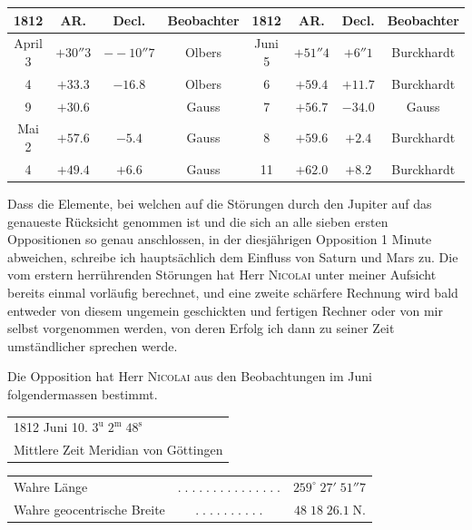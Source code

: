 \begin{center}\fontsize{9}{11}\selectfont\setlength{\tabcolsep}{3pt}
\renewcommand{\arraystretch}{1.15}\begin{tabular}{c|c|c|c||c|c|c|c}
1812 & AR. & Decl. & Beobachter & 1812 & AR. & Decl. & Beobachter\\\hline
April 3 & $+30''3$ & $-\!-10''7$ & Olbers & Juni 5 & $+51''4$ & $+6''1$ & Burckhardt\\
4 & $+33.3$ & $-16.8$ & Olbers & 6 & $+59.4$ & $+11.7$ & Burckhardt\\
9 & $+30.6$ &  & Gauss & 7 & $+56.7$ & $-34.0$ & Gauss\\
Mai 2 & $+57.6$ & $-5.4$ & Gauss & 8 & $+59.6$ & $+2.4$ & Burckhardt\\
4 & $+49.4$ & $+6.6$ & Gauss & 11 & $+62.0$ & $+8.2$ & Burckhardt\\
\end{tabular}\end{center}

\par\indent Dass die Elemente, bei welchen auf die Störungen durch den Jupiter auf das genaueste Rücksicht
genommen ist und die sich an alle sieben ersten Oppositionen so genau anschlossen, in der diesjährigen
Opposition 1 Minute abweichen, schreibe ich hauptsächlich dem Einfluss von Saturn und Mars
zu. Die vom erstern herrührenden Störungen hat Herr \textsc{Nicolai} unter meiner Aufsicht bereits einmal
vorläufig berechnet, und eine zweite schärfere Rechnung wird bald entweder von diesem ungemein geschickten
und fertigen Rechner oder von mir selbst vorgenommen werden, von deren Erfolg ich dann
zu seiner Zeit umständlicher sprechen werde.

\par\indent Die Opposition hat Herr \textsc{Nicolai} aus den Beobachtungen im Juni folgendermassen bestimmt.

\begin{center}\fontsize{10}{12}\selectfont\setlength{\tabcolsep}{0pt}\renewcommand{\arraystretch}{1.15}\begin{tabular}{l}
1812 Juni 10. $3^{\mathrm u}\;2^{\mathrm m}\;48^{\mathrm s}$\\Mittlere Zeit Meridian von Göttingen
\end{tabular}\end{center}
\begin{center}\fontsize{10}{12}\selectfont\setlength{\tabcolsep}{2pt}\renewcommand{\arraystretch}{1.15}\begin{tabular}{lcr}
Wahre Länge & $.\;.\;.\;.\;.\;.\;.\;.\;.\;.\;.\;.\;.\;.\;.$ & $259^\circ\;27'\;51''7$\\
Wahre geocentrische Breite & $.\;.\;.\;.\;.\;.\;.\;.\;.\;.$ & $48\;18\;26.1\;\mathrm{N}.$\\
\end{tabular}\end{center}


